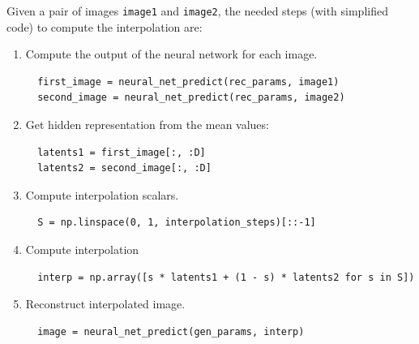 \documentclass[11pt]{article}
\begin{document}
Given a pair of images \texttt{image1} and \texttt{image2}, the needed steps (with simplified code) to compute the interpolation are:
\begin{enumerate}
  \item Compute the output of the neural network for each image.
        \begin{verbatim}
  first_image = neural_net_predict(rec_params, image1)
  second_image = neural_net_predict(rec_params, image2)
\end{verbatim}
  \item Get hidden representation from the mean values:
        \begin{verbatim}
  latents1 = first_image[:, :D]
  latents2 = second_image[:, :D]
\end{verbatim}

  \item Compute interpolation scalars.
        \begin{verbatim}
  S = np.linspace(0, 1, interpolation_steps)[::-1]
\end{verbatim}
  \item Compute interpolation
        \begin{verbatim}
  interp = np.array([s * latents1 + (1 - s) * latents2 for s in S])
        \end{verbatim}
  \item Reconstruct interpolated image.
        \begin{verbatim}
  image = neural_net_predict(gen_params, interp)
          \end{verbatim}
\end{enumerate}
\end{document}
